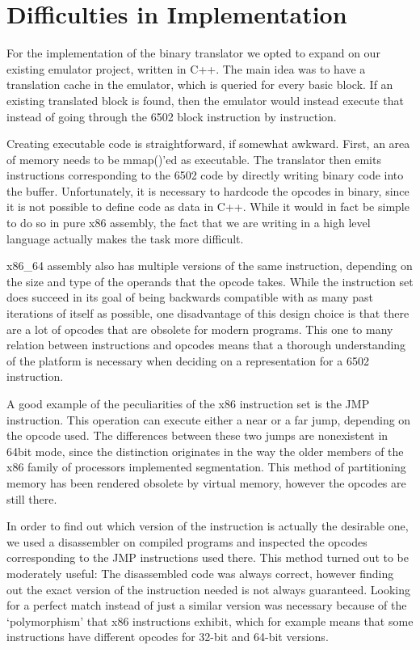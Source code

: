 \section{Difficulties in Implementation}

For the implementation of the binary translator we opted to expand on our existing emulator project, written in C++.
The main idea was to have a translation cache in the emulator, which is queried for every basic block. 
If an existing translated block is found, then the emulator would instead execute that instead of going through the 6502 block instruction by instruction.

Creating executable code is straightforward, if somewhat awkward. First, an area of memory needs to be mmap()'ed as executable. 
The translator then emits instructions corresponding to the 6502 code by directly writing binary code into the buffer. 
Unfortunately, it is necessary to hardcode the opcodes in binary, since it is not possible to define code as data in C++. 
While it would in fact be simple to do so in pure x86 assembly, the fact that we are writing in a high level language actually makes the task more difficult.

x86\_64 assembly also has multiple versions of the same instruction, depending on the size and type of the operands that the opcode takes.
While the instruction set does succeed in its goal of being backwards compatible with as many past iterations of itself as possible, one disadvantage of this design choice is that there are a lot of opcodes that are obsolete for modern programs.
This one to many relation between instructions and opcodes means that a thorough understanding of the platform is necessary when deciding on a representation for a 6502 instruction.

A good example of the peculiarities of the x86 instruction set is the JMP instruction. 
This operation can execute either a near or a far jump, depending on the opcode used.
The differences between these two jumps are nonexistent in 64bit mode, since the distinction originates in the way the older members of the x86 family of processors implemented segmentation.
This method of partitioning memory has been rendered obsolete by virtual memory, however the opcodes are still there.

In order to find out which version of the instruction is actually the desirable one, we used a disassembler on compiled programs and inspected the opcodes corresponding to the JMP instructions used there.
This method turned out to be moderately useful: The disassembled code was always correct, however finding out the exact version of the instruction needed is not always guaranteed.
Looking for a perfect match instead of just a similar version was necessary because of the `polymorphism' that x86 instructions exhibit, which for example means that some instructions have different opcodes for 32-bit and 64-bit versions.

